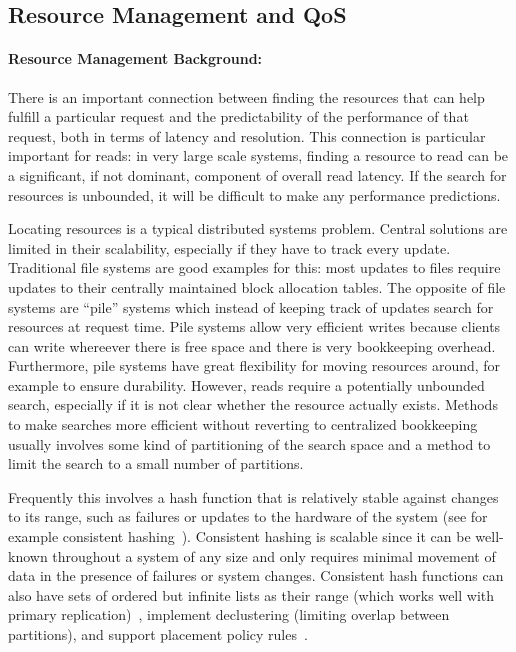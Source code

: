 \subsection{Resource Management and QoS}
\label{sec:qos}

\paragraph{Resource Management Background:} There is an important connection between finding the resources that can help fulfill a particular request and the predictability of the performance of that request, both in terms of latency and resolution. This connection is particular important for reads: in very large scale systems, finding a resource to read can be a significant, if not dominant, component of overall read latency. If the search for resources is unbounded, it will be difficult to make any performance predictions. 

Locating resources is a typical distributed systems problem. Central solutions are limited in their scalability, especially if they have to track every update. Traditional file systems are good examples for this: most updates to files require updates to their centrally maintained block allocation tables. The opposite of file systems are ``pile'' systems which instead of keeping track of updates search for resources at request time. Pile systems allow very efficient writes because clients can write whereever there is free space and there is very bookkeeping overhead. Furthermore, pile systems have great flexibility for moving resources around, for example to ensure durability. However, reads require a potentially unbounded search, especially if it is not clear whether the resource actually exists. Methods to make searches more efficient without reverting to centralized bookkeeping usually involves some kind of partitioning of the search space and a method to limit the search to a small number of partitions. 

Frequently this involves a hash function that is relatively stable against changes to its range, such as failures or updates to the hardware of the system (see for example consistent hashing~\cite{karger:stoc97}). Consistent hashing is scalable since it can be well-known throughout a system of any size and only requires minimal movement of data in the presence of failures or system changes. Consistent hash functions can also have sets of ordered but infinite lists as their range (which works well with primary replication)~\cite{honicky:ipdps04}, implement declustering (limiting overlap between partitions), and support placement policy rules~\cite{weil:sc06}.


